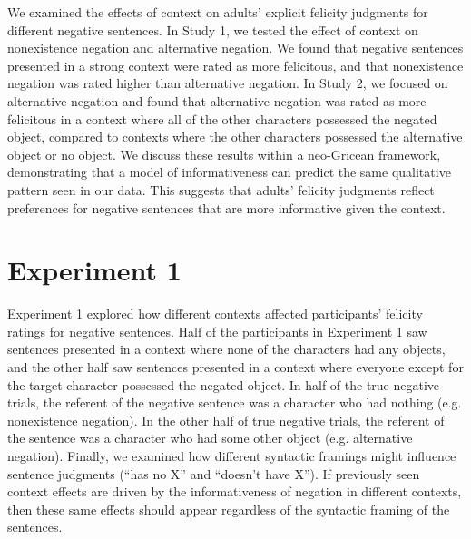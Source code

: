 \documentclass[10pt,letterpaper]{article}
\begin{document}
We examined the effects of context on adults' explicit felicity judgments for different negative sentences.  In Study 1, we tested the effect of context on nonexistence negation and alternative negation.  We found that negative sentences presented in a strong context were rated as more felicitous, and that nonexistence negation was rated higher than alternative negation.  In Study 2, we focused on alternative negation and found that alternative negation was rated as more felicitous in a context where all of the other characters possessed the negated object, compared to contexts where the other characters possessed the alternative object or no object.  We discuss these results within a neo-Gricean framework, demonstrating that a model of informativeness can predict the same qualitative pattern seen in our data.  This suggests that adults' felicity judgments reflect preferences for negative sentences that are more informative given the context.  

\section{Experiment 1}

Experiment 1 explored how different contexts affected participants' felicity ratings for negative sentences.  Half of the participants in Experiment 1 saw sentences presented in a context where none of the characters had any objects, and the other half saw sentences presented in a context where everyone except for the target character possessed the negated object.  In half of the true negative trials, the referent of the negative sentence was a character who had nothing (e.g. nonexistence negation).  In the other half of true negative trials, the referent of the sentence was a character who had some other object (e.g. alternative negation).  
Finally, we examined how different syntactic framings might influence sentence judgments (``has no X'' and ``doesn't have X''). 
If previously seen context effects are driven by the informativeness of negation in different contexts, then these same effects should appear regardless of the syntactic framing of the sentences.  
\end{document}
